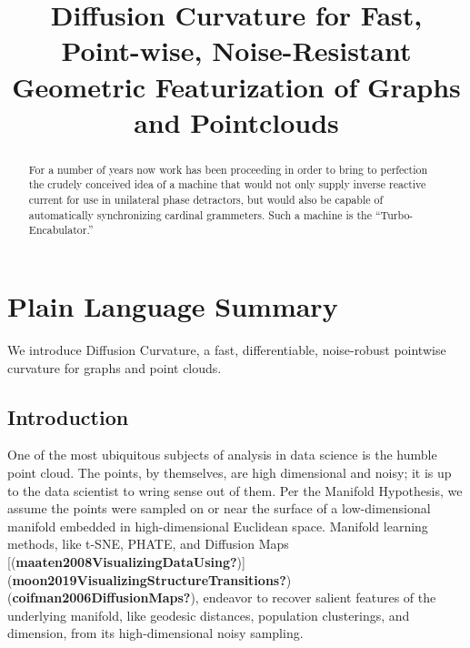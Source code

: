 \documentclass[
]{agujournal2019}
\begin{document}
\title{Diffusion Curvature for Fast, Point-wise, Noise-Resistant
Geometric Featurization of Graphs and Pointclouds}



\begin{abstract}
For a number of years now work has been proceeding in order to bring to
perfection the crudely conceived idea of a machine that would not only
supply inverse reactive current for use in unilateral phase detractors,
but would also be capable of automatically synchronizing cardinal
grammeters. Such a machine is the ``Turbo-Encabulator.''
\end{abstract}

\section*{Plain Language Summary}
We introduce Diffusion Curvature, a fast, differentiable, noise-robust
pointwise curvature for graphs and point clouds.



\subsection{Introduction}\label{introduction}

One of the most ubiquitous subjects of analysis in data science is the
humble point cloud. The points, by themselves, are high dimensional and
noisy; it is up to the data scientist to wring sense out of them. Per
the Manifold Hypothesis, we assume the points were sampled on or near
the surface of a low-dimensional manifold embedded in high-dimensional
Euclidean space. Manifold learning methods, like t-SNE, PHATE, and
Diffusion Maps
{[}(\textbf{maaten2008VisualizingDataUsing?}){]}(\textbf{moon2019VisualizingStructureTransitions?})(\textbf{coifman2006DiffusionMaps?}),
endeavor to recover salient features of the underlying manifold, like
geodesic distances, population clusterings, and dimension, from its
high-dimensional noisy sampling.
\end{document}

